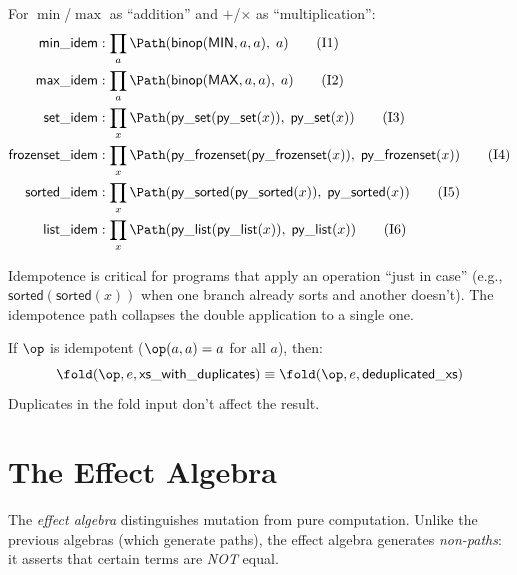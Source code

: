 \begin{definition}
For $\min$/$\max$ as ``addition'' and $+$/$\times$ as ``multiplication'':
\begin{align}
  \mathsf{min\_idem} &: \prod_a
    \Path(\mathsf{binop}(\mathsf{MIN}, a, a),\; a)
    \tag{I1} \\
  \mathsf{max\_idem} &: \prod_a
    \Path(\mathsf{binop}(\mathsf{MAX}, a, a),\; a)
    \tag{I2} \\
  \mathsf{set\_idem} &: \prod_x
    \Path(\mathsf{py\_set}(\mathsf{py\_set}(x)),\;
          \mathsf{py\_set}(x))
    \tag{I3} \\
  \mathsf{frozenset\_idem} &: \prod_x
    \Path(\mathsf{py\_frozenset}(\mathsf{py\_frozenset}(x)),\;
          \mathsf{py\_frozenset}(x))
    \tag{I4} \\
  \mathsf{sorted\_idem} &: \prod_x
    \Path(\mathsf{py\_sorted}(\mathsf{py\_sorted}(x)),\;
          \mathsf{py\_sorted}(x))
    \tag{I5} \\
  \mathsf{list\_idem} &: \prod_x
    \Path(\mathsf{py\_list}(\mathsf{py\_list}(x)),\;
          \mathsf{py\_list}(x))
    \tag{I6}
\end{align}
\end{definition}

Idempotence is critical for programs that apply an operation
``just in case'' (e.g., $\mathsf{sorted}(\mathsf{sorted}(x))$ when
one branch already sorts and another doesn't).  The idempotence path
collapses the double application to a single one.

\begin{proposition}
If $\op$ is idempotent ($\op(a, a) = a$ for all $a$), then:
\[
  \fold(\op, e, \mathsf{xs\_with\_duplicates}) \equiv
  \fold(\op, e, \mathsf{deduplicated\_xs})
\]
Duplicates in the fold input don't affect the result.
\end{proposition}


\section{The Effect Algebra}

The \emph{effect algebra} distinguishes mutation from pure computation.
Unlike the previous algebras (which generate paths), the effect
algebra generates \emph{non-paths}: it asserts that certain terms
are \emph{NOT} equal.

